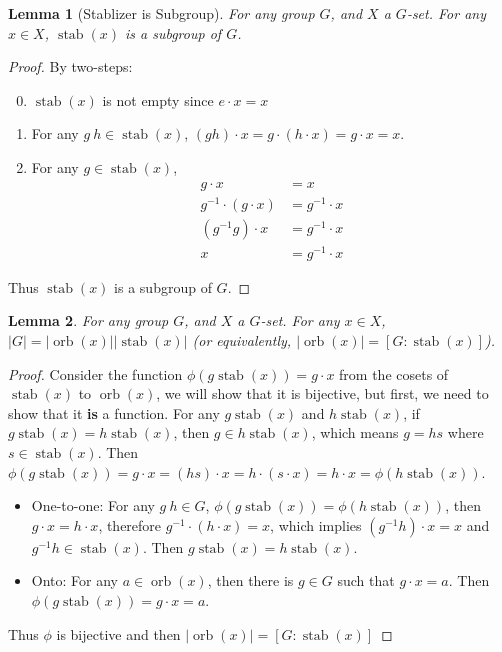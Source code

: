 \documentclass[14pt]{extarticle}
\newtheorem{lemma}{Lemma}[section]
\DeclareMathOperator{\orb}{orb}
\DeclareMathOperator{\stab}{stab}
\newcommand{\inv}[1]{#1^{-1}}
\newcommand{\1}{\{e\}}
\begin{document}
\begin{lemma}[Stablizer is Subgroup]
  For any group $G$, and $X$ a $G$-set. For any $x \in X$, $\stab(x)$ is a subgroup of $G$.
\end{lemma}
\begin{proof}
  By two-steps:
  \begin{enumerate}
    \setcounter{enumi}{-1}
    \item $\stab(x)$ is not empty since $e \cdot x = x$
    \item For any $g \ h \in \stab(x)$, $(gh) \cdot x = g \cdot (h \cdot x) = g \cdot x = x$.
    \item For any $g \in \stab(x)$, 
      \begin{align*}
        g \cdot x &= x \\
        \inv{g} \cdot (g \cdot x) &= \inv{g} \cdot x \\
        (\inv{g} g) \cdot x &= \inv{g} \cdot x \\
        x &= \inv{g} \cdot x
      \end{align*}
  \end{enumerate}
  Thus $\stab(x)$ is a subgroup of $G$.
\end{proof}

\begin{lemma}
  For any group $G$, and $X$ a $G$-set. For any $x \in X$, $|G| = |\orb(x)||\stab(x)|$
  (or equivalently, $|\orb(x)| = [ G : \stab(x) ]$).
\end{lemma}
\begin{proof}
  Consider the function $\phi(g\stab(x)) = g \cdot x$ 
  from the cosets of $\stab(x)$
  to $\orb(x)$, we will show that it is bijective,
  but first, we need to show that it \textbf{is} a function.
  For any $g\stab(x)$ and $h\stab(x)$, if $g\stab(x) = h\stab(x)$,
  then $g \in h\stab(x)$, which means $g = hs$ where $s \in \stab(x)$.
  Then $\phi(g\stab(x)) = g \cdot x = (hs) \cdot x = h \cdot (s \cdot x) = h \cdot x = \phi(h\stab(x))$.

  \begin{itemize}
    \item One-to-one: For any $g \ h \in G$, $\phi(g\stab(x)) = \phi(h\stab(x))$,
      then $g \cdot x = h \cdot x$, therefore $\inv{g} \cdot (h \cdot x) = x$,
      which implies $(\inv{g}h) \cdot x = x$ and $\inv{g}h \in \stab(x)$.
      Then $g\stab(x) = h\stab(x)$.
    \item Onto: For any $a \in \orb(x)$, then there is $g \in G$ such that $g \cdot x = a$.
          Then $\phi(g\stab(x)) = g \cdot x = a$.
  \end{itemize}
  Thus $\phi$ is bijective and then $|\orb(x)| = [ G : \stab(x) ]$
\end{proof}
\end{document}
